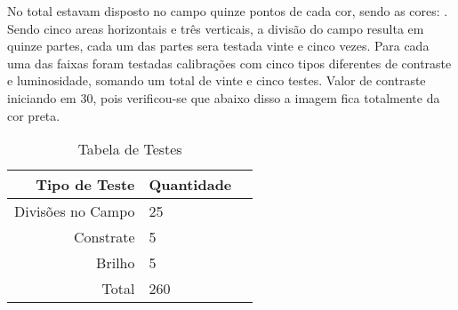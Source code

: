 No total estavam disposto no campo quinze pontos de cada cor, sendo as cores: . Sendo cinco areas horizontais e três verticais, a divisão do campo resulta em quinze partes, cada um das partes sera testada vinte e cinco vezes.
 Para cada uma das faixas foram testadas calibrações com cinco tipos diferentes de contraste e luminosidade, somando um total de vinte e cinco testes.	
	Valor de contraste iniciando em 30, pois verificou-se que abaixo disso a imagem fica totalmente da cor preta.
	
\begin{table}[h]
\centering
\caption{Tabela de Testes}
\begin{tabular}{r|lr}
Tipo de Teste & Quantidade \\ %
\hline                               %
Divisões no Campo        & 25 \\
Constrate  & 5\\
Brilho            & 5 \\
\hline  
Total & 260
 
\end{tabular}
\end{table}
